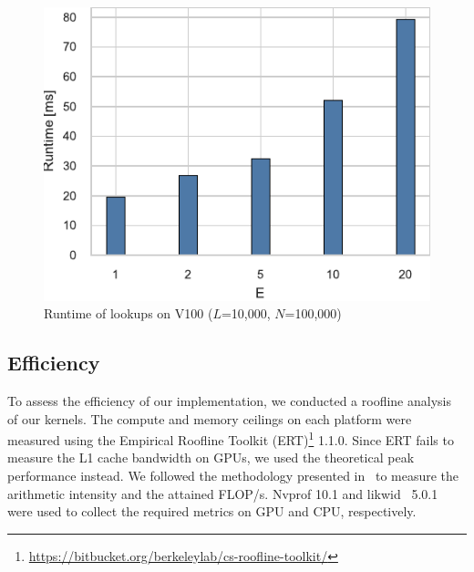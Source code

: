 \documentclass[conference]{IEEEtran}
\begin{document}
\begin{figure}
    \centering
    \includegraphics{figs/runtime_lookup_v100}
    \caption{Runtime of lookups on V100 ($L$=10,000, $N$=100,000)}%
    \label{fig:breakdown-lookup-v100}
\end{figure}

\subsection{Efficiency}

To assess the efficiency of our implementation, we conducted a roofline
analysis~\cite{Williams2008} of our kernels. The compute and memory ceilings
on each platform were measured using the Empirical Roofline Toolkit (ERT)\footnote{\url{https://bitbucket.org/berkeleylab/cs-roofline-toolkit/}} 1.1.0.
Since ERT fails to measure the L1 cache bandwidth on GPUs, we used the
theoretical peak performance instead. We followed the methodology presented
in~\cite{Yang2020a,Yang2020b} to measure the arithmetic intensity and the
attained FLOP/s. Nvprof 10.1 and likwid~\cite{Treibig2010} 5.0.1 were used to
collect the required metrics on GPU and CPU, respectively.

\end{document}
